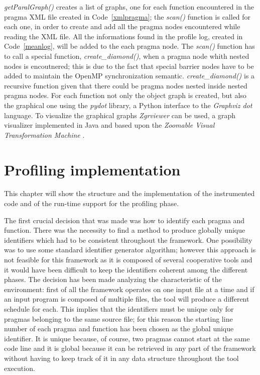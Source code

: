 \documentclass[a4paper,11pt,oneside]{book}
\begin{document}
\emph{getParalGraph()} creates a list of graphs, one for each function encountered in the pragma XML file created in Code~\ref{xmlpragma}; the \emph{scan()} function is called for each one, in order to create and add all the pragma nodes encountered while reading the XML file. All the informations found in the profile log, created in Code~\ref{meanlog}, will be added to the each pragma node. The \emph{scan()} function has to call a special function, \emph{create\_diamond()}, when a pragma node whith nested nodes is encoutnered; this is due to the fact that special barrier nodes have to be added to maintain the OpenMP synchronization semantic. \emph{create\_diamond()} is a recursive function given that there could be pragma nodes nested inside nested pragma nodes. For each function not only the object graph is created, but also the graphical one using the \emph{pydot} library, a Python interface to the \emph{Graphviz dot} language. To visualize the graphical graphs \emph{Zgrviewer} can be used, a graph visualizer implemented in Java and based upon the \emph{Zoomable Visual Transformation Machine} \cite{zvtm}.


\section{Profiling implementation}
This chapter will show the structure and the implementation of the instrumented code and of the run-time support for the profiling phase.

The first crucial decision that was made was how to identify each pragma and function. There was the necessity to find a method to produce globally unique identifiers which had to be consistent throughout the framework. One possibility was to use some standard identifier generator algorithm; however this approach is not feasible for this framework as it is composed of several cooperative tools and it would have been difficult to keep the identifiers coherent among the different phases. The decision has been made analyzing the characteristic of the environment: first of all the framework operates on one input file at a time and if an input program is composed of multiple files, the tool will produce a different schedule for each. This implies that the identifiers must be unique only for pragmas belonging to the same source file; for this reason the starting line number of each pragma and function has been chosen as the global unique identifier. It is unique because, of course, two pragmas cannot start at the same code line and it is global because it can be retrieved in any part of the framework without having to keep track of it in any data structure throughout the tool execution.
\end{document}
